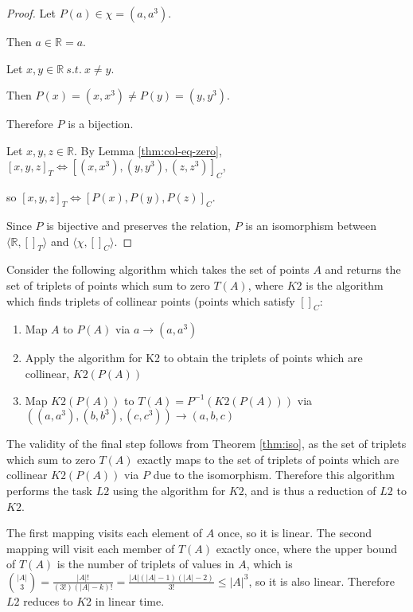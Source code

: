 \documentclass[11pt]{article}
\begin{document}
\begin{proof}  

    Let $P(a) \in \chi = (a, a^3)$. 

    Then $a \in \mathbb{R} = a$. 

    Let $x, y \in \mathbb{R} \  s.t. \  x \neq y$. 

    Then $P(x) = (x, x^3) \neq P(y) = (y, y^3)$. 

    Therefore $P$ is a bijection.

    Let $x, y, z \in \mathbb{R}$. By Lemma \ref{thm:col-eq-zero}, $[x, y, z]_T \iff [(x, x^3), (y, y^3), (z, z^3)]_C$, 
    
    so $[x, y, z]_T \iff [P(x), P(y), P(z)]_C$.

    Since $P$ is bijective and preserves the relation, $P$ is an isomorphism between $\langle \mathbb{R}, []_T \rangle$ and $\langle \chi, []_C \rangle$.
\end{proof}


Consider the following algorithm which takes the set of points $A$ and returns the set of triplets of points which sum to zero $T(A)$, where $K2$ is the algorithm which finds triplets of collinear points (points which satisfy $[]_C$:
\begin{enumerate}
    \item Map $A$ to $P(A)$ via $a \to (a, a^3)$
    \item Apply the algorithm for K2 to obtain the triplets of points which are collinear, $K2(P(A))$
    \item Map $K2(P(A))$ to $T(A) = P^{-1}(K2(P(A)))$ via $((a, a^3), (b, b^3), (c, c^3)) \to (a, b, c)$
\end{enumerate}

The validity of the final step follows from Theorem \ref{thm:iso}, as the set of triplets which sum to zero $T(A)$ exactly maps to the set of triplets of points which are collinear $K2(P(A))$ via $P$ due to the
isomorphism. Therefore this algorithm performs the task $L2$ using the algorithm for $K2$, and is thus a reduction of $L2$ to $K2$.

The first mapping visits each element of $A$ once, so it is linear. The second mapping will visit each member of $T(A)$ exactly once, where the upper bound of $T(A)$ is the number of triplets of values in $A$, which is $\binom{|A|}{3} = \frac{|A|!}{(3!)(|A| - k)!} = \frac{|A|(|A| - 1)(|A| - 2)}{3!} \leq |A|^3$, so it is also linear. Therefore $L2$ reduces to $K2$ in linear time.
\end{document}
